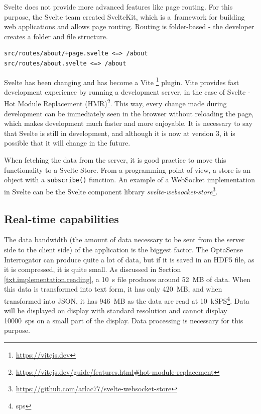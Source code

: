 Svelte does not provide more advanced features like page routing. For this purpose, the Svelte team created SvelteKit, which is a~framework for building web applications and allows page routing. Routing is folder-based - the developer creates a folder and file structure.

\begin{verbatim}
src/routes/about/+page.svelte <=> /about
src/routes/about.svelte <=> /about
\end{verbatim}

Svelte has been changing and has become a Vite \footnote{\url{https://vitejs.dev}} plugin. Vite provides fast development experience by running a development server, in the case of Svelte - Hot Module Replacement (HMR)\footnote{\url{https://vitejs.dev/guide/features.html\#hot-module-replacement}}. This way, every change made during development can be immediately seen in the browser without reloading the page, which makes development much faster and more enjoyable. It is necessary to say that Svelte is still in development, and although it is now at version 3, it is possible that it will change in the future. 

When fetching the data from the server, it is good practice to move this functionality to a Svelte Store. From a programming point of view, a store is an object with a \verb|subscribe()| function. An example of a WebSocket implementation in Svelte can be the Svelte component library \textit{svelte-websocket-store}\footnote{\url{https://github.com/arlac77/svelte-websocket-store}}.


\subsection{Real-time capabilities}\label{txt.design.frontend.realtime}

The data bandwidth (the amount of data necessary to be sent from the server side to the client side) of the application is the biggest factor. The OptaSense Interrogator can produce quite a lot of data, but if it is saved in an HDF5 file, as it is compressed, it is quite small. As discussed in Section \ref{txt.implementation.reading}, a \qty{10}{\second} file produces around \qty{52}{MB} of data. When this data is transformed into text form, it has only \qty{420}{MB}, and when transformed into JSON, it has \qty{946}{MB} as the data are read at  \qty{10}{kSPS}\footnote{\ac{sps}}. Data will be displayed on display with standard resolution and cannot display \qty{10000}{\ac{sps}} on a small part of the display. Data processing is necessary for this purpose. 


